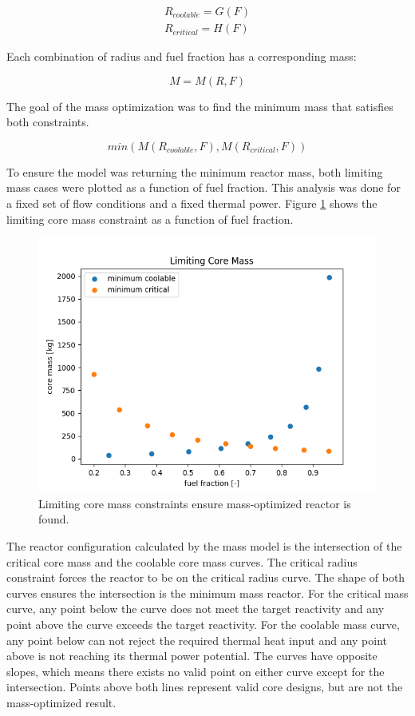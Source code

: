 \begin{align}
    R_{coolable} = G(F) \\
    R_{critical} = H(F)
\end{align}

Each combination of radius and fuel fraction has a corresponding mass:

\begin{equation}
    M = M(R, F)
\end{equation}

The goal of the mass optimization was to find the minimum mass that satisfies
both constraints.

\begin{equation}
    min( M(R_{coolable}, F), M(R_{critical}, F) )
\end{equation}

To ensure the model was returning the minimum reactor mass, both limiting mass
cases were plotted as a function of fuel fraction. This analysis was done for a
fixed set of flow conditions and a fixed thermal power. Figure
\ref{fig:limiting_core_mass} shows the limiting core mass constraint as a
function of fuel fraction.

\begin{figure}[h]
    \centering
    \includegraphics[width=5in]{../images/limiting_core_mass.png}
\caption{Limiting core mass constraints ensure mass-optimized reactor is found.}
\label{fig:limiting_core_mass}
\end{figure}

The reactor configuration calculated by the mass model is the intersection of
the critical core mass and the coolable core mass curves. The critical radius
constraint forces the reactor to be on the critical radius curve. The shape of
both curves ensures the intersection is the minimum mass reactor. For the
critical mass curve, any point below the curve does not meet the target
reactivity and any point above the curve exceeds the target reactivity. For the
coolable mass curve, any point below can not reject the required thermal heat
input and any point above is not reaching its thermal power potential. The
curves have opposite slopes, which means there exists no valid point on either
curve except for the intersection. Points above both lines represent valid
core designs, but are not the mass-optimized result.
